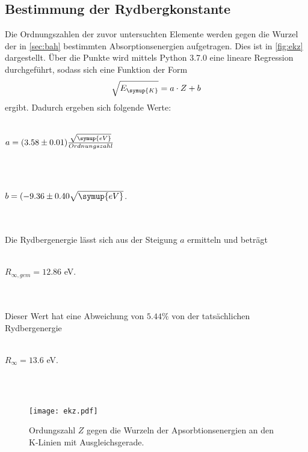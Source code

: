     \subsection{Bestimmung der Rydbergkonstante}  
        Die Ordnungszahlen der zuvor untersuchten Elemente werden gegen die Wurzel der in \autoref{sec:bah} bestimmten Absorptionsenergien
        aufgetragen. Dies ist in \autoref{fig:ekz} dargestellt. 
        Über die Punkte wird mittels Python 3.7.0 eine lineare Regression durchgeführt, sodass sich eine Funktion der Form
        \begin{equation}
        \label{eqn:regress}
            \sqrt{E_{\symup{K}}} = a \cdot Z + b
        \end{equation}
        ergibt. Dadurch ergeben sich folgende Werte:
        \\ \\
        \centerline{$a = (3.58 \pm 0.01) \frac{\sqrt{\symup{eV}}}{Ordnungszahl} $}
        \\ \\
        \centerline{$b = (-9.36 \pm 0.40 \sqrt{\symup{eV}}$.}
        \\ \\
        Die Rydbergenergie lässt sich aus der Steigung $a$ ermitteln und beträgt
        \\ \\
        \centerline{$R_{\infty, gem} = 12.86$ eV.}
        \\ \\
        Dieser Wert hat eine Abweichung von $5.44 \%$ von der tatsächlichen Rydbergenergie
        \\ \\
        \centerline{$R_{\infty} = 13.6$ eV.}
        \\ \\
        \begin{figure}
            \centering
            \texttt{[image: ekz.pdf]}
            \caption{Ordungszahl $Z$ gegen die Wurzeln der Apsorbtionsenergien an den K-Linien mit Ausgleichsgerade.}
            \label{fig:ekz}
        \end{figure}

